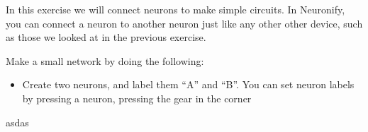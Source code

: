 \begin{Exercise}
In this exercise we will connect neurons to make simple circuits. In Neuronify, you can connect a neuron to another neuron just like any other other device, such as those we looked at in the previous exercise. 

\begin{ExePart}
Make a small network by doing the following:
\begin{itemize}
\item Create two neurons, and label them ``A'' and ``B''. You can set neuron labels by pressing a neuron, pressing the gear in the \gearpos  corner
\end{itemize}
asdas
\end{ExePart}

\end{Exercise}